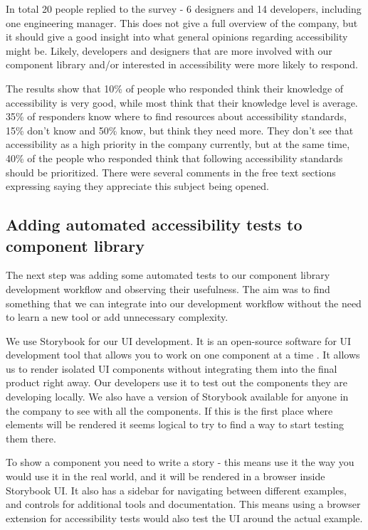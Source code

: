 \documentclass{master_thesis}
\begin{document}
In total 20 people replied to the survey - 6 designers and 14 developers, including one engineering manager. This does not give a full overview of the company, but it should give a good insight into what general opinions regarding accessibility might be. Likely, developers and designers that are more involved with our component library and/or interested in accessibility were more likely to respond.

The results show that 10\% of people who responded think their knowledge of accessibility is very good, while most think that their knowledge level is average. 35\% of responders know where to find resources about accessibility standards, 15\% don't know and 50\% know, but think they need more. They don't see that accessibility as a high priority in the company currently, but at the same time, 40\% of the people who responded think that following accessibility standards should be prioritized. There were several comments in the free text sections expressing saying they appreciate this subject being opened.

\subsection{Adding automated accessibility tests to component library}
The next step was adding some automated tests to our component library development workflow and observing their usefulness. The aim was to find something that we can integrate into our development workflow without the need to learn a new tool or add unnecessary complexity.

We use Storybook for our UI development. It is an open-source software for UI development tool that allows you to work on one component at a time \citep{storybook}. It allows us to render isolated UI components without integrating them into the final product right away. Our developers use it to test out the components they are developing locally. We also have a version of Storybook available for anyone in the company to see with all the components. If this is the first place where elements will be rendered it seems logical to try to find a way to start testing them there.

To show a component you need to write a story - this means use it the way you would use it in the real world, and it will be rendered in a browser inside Storybook UI. It also has a sidebar for navigating between different examples, and controls for additional tools and documentation. This means using a browser extension for accessibility tests would also test the UI around the actual example.
\end{document}
